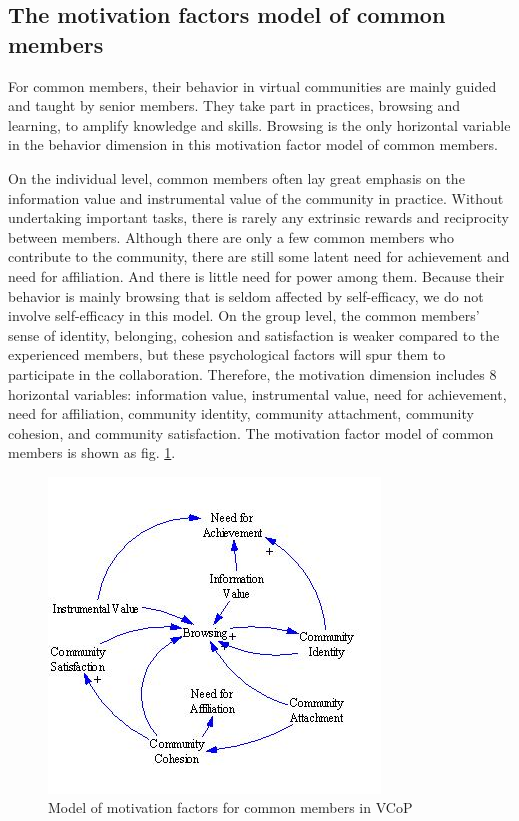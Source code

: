 \documentclass[doublespacing]{elsarticle}
\begin{document}
\subsection{The motivation factors model of common members}
\label{sec:motiv-fact-model-1}

For common members, their behavior in virtual communities are mainly
guided and taught by senior members. They take part in practices,
browsing and learning, to amplify knowledge and skills. Browsing is the only horizontal variable in the behavior dimension in this motivation factor model of common members. 


On the individual level, common members often lay great emphasis on
the information value and instrumental value of the community in
practice. Without undertaking important tasks, there is rarely any extrinsic
rewards and reciprocity between members. Although there are only a few
common members who contribute  to the community, there are still some
latent need for achievement and need for affiliation. And there is
little need for power among them. Because their behavior is mainly
browsing that is seldom affected by self-efficacy, we do not involve self-efficacy in this model. On the group
level, the common members' sense of identity, belonging, cohesion and
satisfaction is weaker compared to the experienced members, but these
psychological factors will spur them to participate in the
collaboration. Therefore, the motivation dimension includes 8
horizontal variables: information value, instrumental value, need for
achievement, need for affiliation, community identity, community
attachment, community cohesion, and community satisfaction. The
motivation factor model of common members is shown as fig. \ref{fig:common-member}.  
\begin{figure}[htpb]
  \centering
 
  \includegraphics{04}
  \caption{Model of motivation factors for common
    members in VCoP}
 \label{fig:common-member}
\end{figure}
\end{document}

